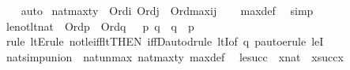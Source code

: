 \begin{isabellebody}
\ \ \isamarkupfalse%
\ auto%
\endisatagproof
{\isafoldproof}%
%
\isadelimproof
\isanewline
%
\endisadelimproof
\isanewline
{}\isamarkupfalse%
\ nat{\isacharunderscore}{\kern0pt}max{\isacharunderscore}{\kern0pt}ty\ {\isacharcolon}{\kern0pt}\ {\isachardoublequoteopen}Ord{\isacharparenleft}{\kern0pt}i{\isacharparenright}{\kern0pt}\ {\isasymLongrightarrow}Ord{\isacharparenleft}{\kern0pt}j{\isacharparenright}{\kern0pt}\ {\isasymLongrightarrow}\ Ord{\isacharparenleft}{\kern0pt}max{\isacharparenleft}{\kern0pt}i{\isacharcomma}{\kern0pt}j{\isacharparenright}{\kern0pt}{\isacharparenright}{\kern0pt}{\isachardoublequoteclose}\isanewline
%
\isadelimproof
\ \ %
\endisadelimproof
%
\isatagproof
{}\isamarkupfalse%
\ max{\isacharunderscore}{\kern0pt}def\ \isamarkupfalse%
\ simp%
\endisatagproof
{\isafoldproof}%
%
\isadelimproof
\isanewline
%
\endisadelimproof
\isanewline
{}\isamarkupfalse%
\ le{\isacharunderscore}{\kern0pt}not{\isacharunderscore}{\kern0pt}lt{\isacharunderscore}{\kern0pt}nat\ {\isacharcolon}{\kern0pt}\ {\isachardoublequoteopen}Ord{\isacharparenleft}{\kern0pt}p{\isacharparenright}{\kern0pt}\ {\isasymLongrightarrow}\ Ord{\isacharparenleft}{\kern0pt}q{\isacharparenright}{\kern0pt}\ {\isasymLongrightarrow}\ {\isasymnot}\ p{\isasymle}\ q\ {\isasymLongrightarrow}\ q\ {\isasymle}\ p{\isachardoublequoteclose}\ \isanewline
%
\isadelimproof
\ \ %
\endisadelimproof
%
\isatagproof
{}\isamarkupfalse%
\ {\isacharparenleft}{\kern0pt}rule\ ltE{\isacharcomma}{\kern0pt}rule\ not{\isacharunderscore}{\kern0pt}le{\isacharunderscore}{\kern0pt}iff{\isacharunderscore}{\kern0pt}lt{\isacharbrackleft}{\kern0pt}THEN\ iffD{}{\isacharbrackright}{\kern0pt}{\isacharcomma}{\kern0pt}auto{\isacharcomma}{\kern0pt}drule\ ltI{\isacharbrackleft}{\kern0pt}of\ q\ p{\isacharbrackright}{\kern0pt}{\isacharcomma}{\kern0pt}auto{\isacharcomma}{\kern0pt}erule\ leI{\isacharparenright}{\kern0pt}%
\endisatagproof
{\isafoldproof}%
%
\isadelimproof
\isanewline
%
\endisadelimproof
\isanewline
{}\isamarkupfalse%
\ nat{\isacharunderscore}{\kern0pt}simp{\isacharunderscore}{\kern0pt}union\ {\isacharequal}{\kern0pt}\ nat{\isacharunderscore}{\kern0pt}un{\isacharunderscore}{\kern0pt}max\ nat{\isacharunderscore}{\kern0pt}max{\isacharunderscore}{\kern0pt}ty\ max{\isacharunderscore}{\kern0pt}def\ \isanewline
\isanewline
{}\isamarkupfalse%
\ le{\isacharunderscore}{\kern0pt}succ\ {\isacharcolon}{\kern0pt}\ {\isachardoublequoteopen}x{\isasymin}nat\ {\isasymLongrightarrow}\ x{\isasymle}succ{\isacharparenleft}{\kern0pt}x{\isacharparenright}{\kern0pt}{\isachardoublequoteclose}%

\end{isabellebody}
